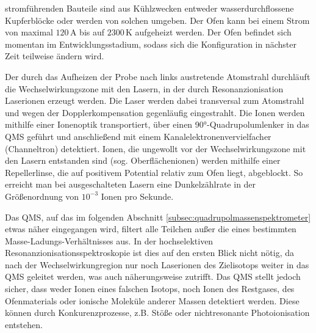 stromführenden Bauteile sind aus Kühlzwecken entweder wasserdurchflossene
Kupferblöcke oder werden von solchen umgeben. Der Ofen kann bei einem Strom von
maximal $120\,$A bis auf $2300\,$K aufgeheizt werden. Der Ofen
befindet sich momentan im Entwicklungsstadium, sodass sich die
Konfiguration in nächster Zeit teilweise ändern wird.\par
Der durch das Aufheizen der Probe nach links austretende Atomstrahl durchläuft
die Wechselwirkungszone mit den Lasern, in der durch Resonanzionisation
Laserionen erzeugt werden. Die Laser werden dabei transversal zum Atomstrahl
und wegen der Dopplerkompensation gegenläufig eingestrahlt. Die Ionen werden
mithilfe einer Ionenoptik transportiert, über einen 90°-Quadrupolumlenker in das
QMS geführt und anschließend mit einem Kanalelektronenvervielfacher
(Channeltron) detektiert.
Ionen, die ungewollt vor der Wechselwirkungszone mit den Lasern entstanden sind
(sog.
Oberflächenionen) werden mithilfe einer Repellerlinse, die auf positivem
Potential relativ zum Ofen liegt, abgeblockt.
So erreicht man bei ausgeschalteten Lasern eine Dunkelzählrate in der
Größenordnung von $10^{-3}$ Ionen pro Sekunde.\par
Das QMS, auf das im folgenden Abschnitt \ref{subsec:quadrupolmassenspektrometer}
etwas näher eingegangen wird, filtert alle Teilchen außer die eines bestimmten
Masse-Ladungs-Verhältnisses aus. In der hochselektiven
Resonanzionisationsspektroskopie ist dies auf den ersten Blick nicht nötig, da nach der Wechselwirkungregion nur noch Laserionen des Zielisotops weiter in das QMS geleitet werden, was auch
näherungsweise zutrifft. Das QMS stellt jedoch sicher, dass weder Ionen
eines falschen Isotops, noch Ionen des Restgases, des Ofenmaterials oder ionische
Moleküle anderer Massen detektiert werden. Diese können durch Konkurenzprozesse,
z.B. Stöße oder nichtresonante Photoionisation entstehen.


